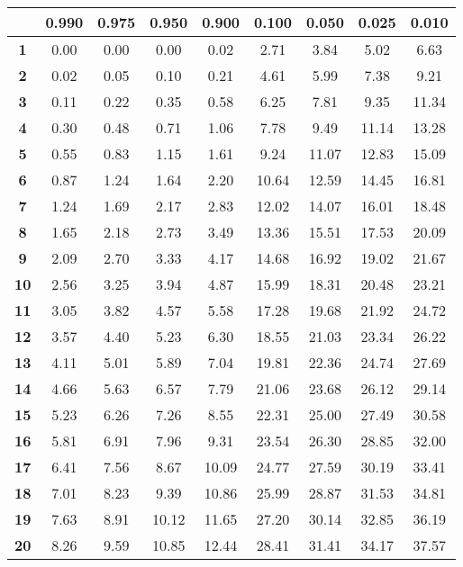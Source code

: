 \noindent\begin{tabular}{*{9}{|c}|}
    \hline
     & \textbf{0.990} & \textbf{0.975} & \textbf{0.950} & \textbf{0.900} & \textbf{0.100} & \textbf{0.050} & \textbf{0.025} & \textbf{0.010}\\
    \hline 
\textbf{1} & 0.00 &0.00 &0.00 &0.02 &2.71 &3.84 &5.02 &6.63 \\
\hline 
\textbf{2} & 0.02 &0.05 &0.10 &0.21 &4.61 &5.99 &7.38 &9.21 \\
\hline 
\textbf{3} & 0.11 &0.22 &0.35 &0.58 &6.25 &7.81 &9.35 &11.34 \\
\hline 
\textbf{4} & 0.30 &0.48 &0.71 &1.06 &7.78 &9.49 &11.14 &13.28 \\
\hline 
\textbf{5} & 0.55 &0.83 &1.15 &1.61 &9.24 &11.07 &12.83 &15.09 \\
\hline 
\textbf{6} & 0.87 &1.24 &1.64 &2.20 &10.64 &12.59 &14.45 &16.81 \\
\hline 
\textbf{7} & 1.24 &1.69 &2.17 &2.83 &12.02 &14.07 &16.01 &18.48 \\
\hline 
\textbf{8} & 1.65 &2.18 &2.73 &3.49 &13.36 &15.51 &17.53 &20.09 \\
\hline 
\textbf{9} & 2.09 &2.70 &3.33 &4.17 &14.68 &16.92 &19.02 &21.67 \\
\hline 
\textbf{10} & 2.56 &3.25 &3.94 &4.87 &15.99 &18.31 &20.48 &23.21 \\
\hline 
\textbf{11} & 3.05 &3.82 &4.57 &5.58 &17.28 &19.68 &21.92 &24.72 \\
\hline 
\textbf{12} & 3.57 &4.40 &5.23 &6.30 &18.55 &21.03 &23.34 &26.22 \\
\hline 
\textbf{13} & 4.11 &5.01 &5.89 &7.04 &19.81 &22.36 &24.74 &27.69 \\
\hline 
\textbf{14} & 4.66 &5.63 &6.57 &7.79 &21.06 &23.68 &26.12 &29.14 \\
\hline 
\textbf{15} & 5.23 &6.26 &7.26 &8.55 &22.31 &25.00 &27.49 &30.58 \\
\hline 
\textbf{16} & 5.81 &6.91 &7.96 &9.31 &23.54 &26.30 &28.85 &32.00 \\
\hline 
\textbf{17} & 6.41 &7.56 &8.67 &10.09 &24.77 &27.59 &30.19 &33.41 \\
\hline 
\textbf{18} & 7.01 &8.23 &9.39 &10.86 &25.99 &28.87 &31.53 &34.81 \\
\hline 
\textbf{19} & 7.63 &8.91 &10.12 &11.65 &27.20 &30.14 &32.85 &36.19 \\
\hline 
\textbf{20} & 8.26 &9.59 &10.85 &12.44 &28.41 &31.41 &34.17 &37.57 \\

\end{tabular}
